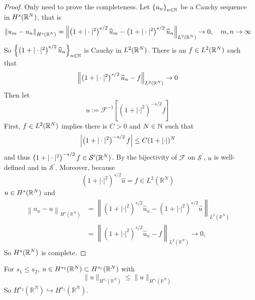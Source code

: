 \begin{proof}
	Only need to prove the completeness. Let $\left\{u_n\right\}_{n \in \mathbb{N}}$ be a Cauchy sequence in $H^s(\mathbb{R}^N)$, that is
	\begin{equation*}
		\left\|u_m-u_n\right\|_{H^s\left(\mathbb{R}^N\right)} = \left\|\left(1+|\cdot|^2\right)^{s / 2} \widehat{u}_m-\left(1+|\cdot|^2\right)^{s / 2} \widehat{u}_n\right\|_{L^2\left(\mathbb{R}^N\right)} \rightarrow 0,\quad m,n \rightarrow \infty
	\end{equation*}
	So $\left\{\left(1+|\cdot|^2\right)^{s / 2} \widehat{u}_n\right\}_{n\in \mathbb{N}}$ is Cauchy in $L^2(\mathbb{R}^N)$. There is an $f \in L^2(\mathbb{R}^N)$ such that
	\begin{equation*}
		\left\|\left(1+|\cdot|^2\right)^{s / 2} \widehat{u}_n-f\right\|_{L^2\left(\mathbb{R}^N\right)} \rightarrow 0
	\end{equation*}
	Then let 
	\begin{equation*}
		u:=\mathcal{F}^{-1}\left[\left(1+|\cdot|^2\right)^{-s / 2} f\right]
	\end{equation*}
	First, $f \in L^2(\mathbb{R}^N)$ implies there is $C>0$ and $N \in \mathbb{N}$ such that
	\begin{equation*}
	 	\left\lvert\left(1+|\cdot|^2\right)^{-s / 2} f\right\lvert \leq C(1+\left\lvert\cdot\right\lvert)^N
	\end{equation*}
	and thus $\left(1+|\cdot|^2\right)^{-s / 2} f \in \mathcal{S}^\prime(\mathbb{R}^N)$. By the bijectivity of $\mathcal{F}$ on $\mathcal{S}^\prime$, $u$ is well-defined and in $\mathcal{S}^\prime$. Moreover, because
	\begin{equation*}
		\left(1+|\cdot|^2\right)^{s / 2} \widehat{u}=f \in L^2\left(\mathbb{R}^N\right)
	\end{equation*}
	$u \in H^s(\mathbb{R}^N)$ and
	\begin{equation*}
		\begin{aligned}
			\left\|u_n-u\right\|_{H^s\left(\mathbb{R}^N\right)} & =\left\|\left(1+|\cdot|^2\right)^{s / 2} \widehat{u}_n-\left(1+|\cdot|^2\right)^{s / 2} \widehat{u}\right\|_{L^2\left(\mathbb{R}^N\right)} \\
			& =\left\|\left(1+|\cdot|^2\right)^{s / 2} \widehat{u}_n-f\right\|_{L^2\left(\mathbb{R}^N\right)} \rightarrow 0,
		\end{aligned}
	\end{equation*}
	So $H^s(\mathbb{R}^N)$ is complete.
\end{proof}
\begin{rmk}
	For $s_1 \leq s_2$, $u \in H^{s_2}(\mathbb{R}^N) \subset H^{s_1}(\mathbb{R}^N)$ with
	\begin{equation*}
		\|u\|_{H^{s_1}\left(\mathbb{R}^N\right)} \leq\|u\|_{H^{s_2}\left(\mathbb{R}^N\right)}
	\end{equation*}
	So $H^{s_2}\left(\mathbb{R}^N\right) \hookrightarrow H^{s_1}\left(\mathbb{R}^N\right)$.
\end{rmk}

